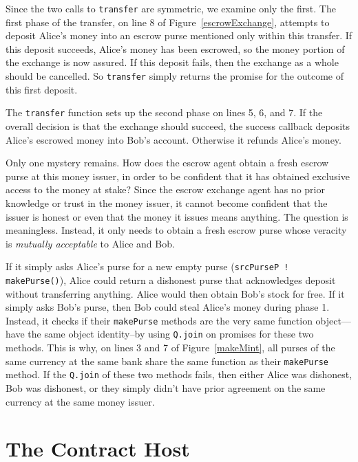 \documentclass{llncs}
\begin{document}
Since the two calls to {\tt transfer} are symmetric, we examine only the first. The first phase of the transfer, on line 8 of Figure~\ref{escrowExchange}, attempts to deposit Alice's money into an escrow purse mentioned only within this transfer. If this deposit succeeds, Alice's money has been escrowed, so the money portion of the exchange is now assured. If this deposit fails, then the exchange as a whole should be cancelled. So {\tt transfer} simply returns the promise for the outcome of this first deposit.

The {\tt transfer} function sets up the second phase on lines 5, 6, and 7. If the overall decision is that the exchange should succeed,  the success callback deposits Alice's escrowed money into Bob's account. Otherwise it refunds Alice's money.

Only one mystery remains. How does the escrow agent obtain a fresh escrow purse at this money issuer, in order to be confident that it has obtained exclusive access to the money at stake? Since the escrow exchange agent has no prior knowledge or trust in the money issuer, it cannot become confident that the issuer is honest or even that the money it issues means anything. The question is meaningless. Instead, it only needs to obtain a fresh escrow purse whose veracity is \emph{mutually acceptable} to Alice and Bob.

If it simply asks Alice's purse for a new empty purse ({\tt srcPurseP ! makePurse()}), Alice could return a dishonest purse that acknowledges deposit without transferring anything. Alice would then obtain Bob's stock for free. If it simply asks Bob's purse, then Bob could steal Alice's money during phase 1. Instead, it checks if their {\tt makePurse} methods are the very same function object---have the same object identity--by using {\tt Q.join} on promises for these two methods. This is why, on lines 3 and 7 of Figure~\ref{makeMint}, all purses of the same currency at the same bank share the same function as their {\tt makePurse} method. If the {\tt Q.join} of these two methods fails, then either Alice was dishonest, Bob was dishonest, or they simply didn't have prior agreement on the same currency at the same money issuer.

\section{The Contract Host}
\label{sec:contract_host}
\end{document}
